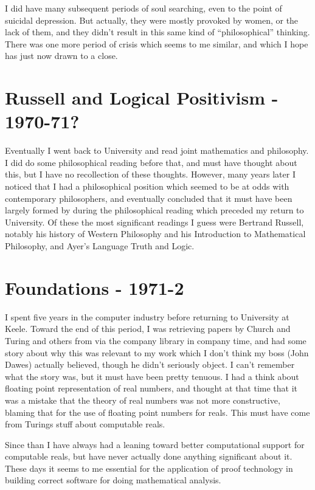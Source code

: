 \documentclass[10pt,titlepage]{book}
\begin{document}
I did have many subsequent periods of soul searching, even to the point of suicidal depression.
But actually, they were mostly provoked by women, or the lack of them, and they didn't result in this same kind of ``philosophical'' thinking.
There was one more period of crisis which seems to me similar, and which I hope has just now drawn to a close.

\section{Russell and Logical Positivism - 1970-71?}

Eventually I went back to University and read joint mathematics and philosophy.
I did do some philosophical reading before that, and must have thought about this, but I have no recollection of these thoughts.
However, many years later I noticed that I had a philosophical position which seemed to be at odds with contemporary philosophers, and eventually concluded that it must have been largely formed by during the philosophical reading which preceded my return to University.
Of these the most significant readings I guess were Bertrand Russell, notably his history of Western Philosophy and his Introduction to Mathematical Philosophy, and Ayer's Language Truth and Logic.

\section{Foundations - 1971-2}

I spent five years in the computer industry before returning to University at Keele.
Toward the end of this period, I was retrieving papers by Church and Turing and others from via the company library in company time, and had some story about why this was relevant to my work which I don't think my boss (John Dawes) actually believed, though he didn't seriously object.
I can't remember what the story was, but it must have been pretty tenuous.
I had a think about floating point representation of real numbers, and thought at that time that it was a mistake that the theory of real numbers was not more constructive, blaming that for the use of floating point numbers for reals.
This must have come from Turings stuff about computable reals.

Since than I have always had a leaning toward better computational support for computable reals, but have never actually done anything significant about it.
These days it seems to me essential for the application of proof technology in building correct software for doing mathematical analysis.
\end{document}
